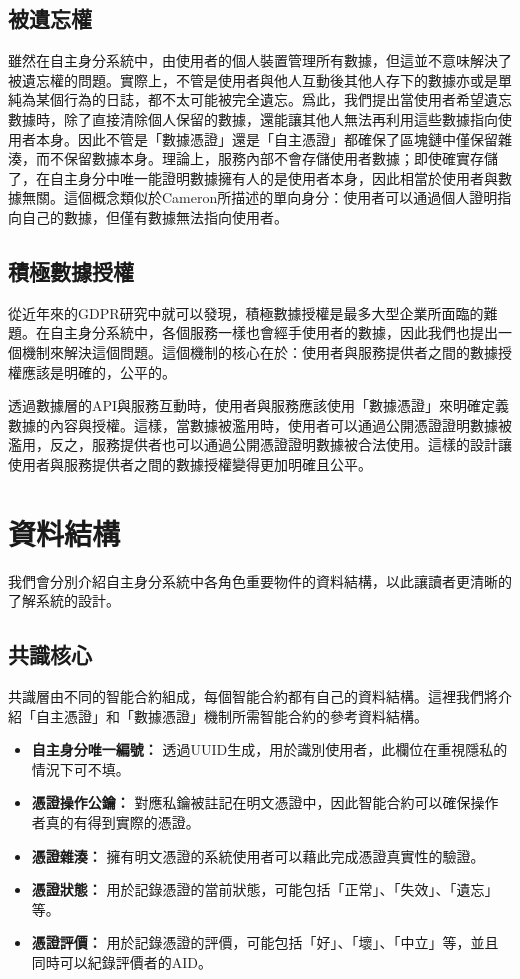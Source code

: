 \subsection{被遺忘權}
雖然在自主身分系統中，由使用者的個人裝置管理所有數據，但這並不意味解決了被遺忘權的問題。實際上，不管是使用者與他人互動後其他人存下的數據亦或是單純為某個行為的日誌，都不太可能被完全遺忘。爲此，我們提出當使用者希望遺忘數據時，除了直接清除個人保留的數據，還能讓其他人無法再利用這些數據指向使用者本身。因此不管是「數據憑證」還是「自主憑證」都確保了區塊鏈中僅保留雜湊，而不保留數據本身。理論上，服務內部不會存儲使用者數據；即使確實存儲了，在自主身分中唯一能證明數據擁有人的是使用者本身，因此相當於使用者與數據無關。這個概念類似於Cameron\cite{cameron2005laws}所描述的單向身分：使用者可以通過個人證明指向自己的數據，但僅有數據無法指向使用者。
\subsection{積極數據授權}
從近年來的GDPR研究中就可以發現，積極數據授權是最多大型企業所面臨的難題。在自主身分系統中，各個服務一樣也會經手使用者的數據，因此我們也提出一個機制來解決這個問題。這個機制的核心在於：使用者與服務提供者之間的數據授權應該是明確的，公平的。

透過數據層的API與服務互動時，使用者與服務應該使用「數據憑證」來明確定義數據的內容與授權。這樣，當數據被濫用時，使用者可以通過公開憑證證明數據被濫用，反之，服務提供者也可以通過公開憑證證明數據被合法使用。這樣的設計讓使用者與服務提供者之間的數據授權變得更加明確且公平。
\section{資料結構}
我們會分別介紹自主身分系統中各角色重要物件的資料結構，以此讓讀者更清晰的了解系統的設計。
\subsection{共識核心}
共識層由不同的智能合約組成，每個智能合約都有自己的資料結構。這裡我們將介紹「自主憑證」和「數據憑證」機制所需智能合約的參考資料結構。
\begin{itemize}
  \item \textbf{自主身分唯一編號：} 透過UUID生成，用於識別使用者，此欄位在重視隱私的情況下可不填。
  \item \textbf{憑證操作公鑰：} 對應私鑰被註記在明文憑證中，因此智能合約可以確保操作者真的有得到實際的憑證。
  \item \textbf{憑證雜湊：} 擁有明文憑證的系統使用者可以藉此完成憑證真實性的驗證。
  \item \textbf{憑證狀態：} 用於記錄憑證的當前狀態，可能包括「正常」、「失效」、「遺忘」等。
  \item \textbf{憑證評價：} 用於記錄憑證的評價，可能包括「好」、「壞」、「中立」等，並且同時可以紀錄評價者的AID。
\end{itemize}
